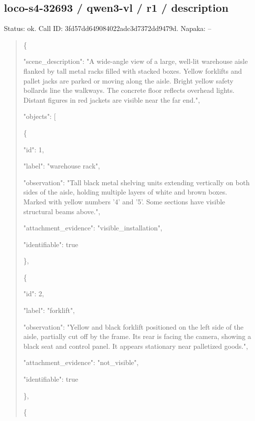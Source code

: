 \documentclass[10pt,a4paper]{article}
\begin{document}
\subsection*{loco-s4-32693 / qwen3-vl / r1 / description}
Status: ok. Call ID: 3fd57dd649084022adc3d7372dd9479d. Napaka: --
\begin{quote}\footnotesize
\{\par
  "scene\_description":\allowbreak{} "A wide-angle view of a large,\allowbreak{} well-lit warehouse aisle flanked by tall metal racks filled with stacked boxes. Yellow forklifts and pallet jacks are parked or moving along the aisle. Bright yellow safety bollards line the walkways. The concrete floor reflects overhead lights. Distant figures in red jackets are visible near the far end.",\allowbreak{}\par
  "objects":\allowbreak{} [\par
    \{\par
      "id":\allowbreak{} 1,\allowbreak{}\par
      "label":\allowbreak{} "warehouse rack",\allowbreak{}\par
      "observation":\allowbreak{} "Tall black metal shelving units extending vertically on both sides of the aisle,\allowbreak{} holding multiple layers of white and brown boxes. Marked with yellow numbers '4' and '5'. Some sections have visible structural beams above.",\allowbreak{}\par
      "attachment\_evidence":\allowbreak{} "visible\_installation",\allowbreak{}\par
      "identifiable":\allowbreak{} true\par
    \},\allowbreak{}\par
    \{\par
      "id":\allowbreak{} 2,\allowbreak{}\par
      "label":\allowbreak{} "forklift",\allowbreak{}\par
      "observation":\allowbreak{} "Yellow and black forklift positioned on the left side of the aisle,\allowbreak{} partially cut off by the frame. Its rear is facing the camera,\allowbreak{} showing a black seat and control panel. It appears stationary near palletized goods.",\allowbreak{}\par
      "attachment\_evidence":\allowbreak{} "not\_visible",\allowbreak{}\par
      "identifiable":\allowbreak{} true\par
    \},\allowbreak{}\par
    \{\par

\end{quote}
\end{document}
